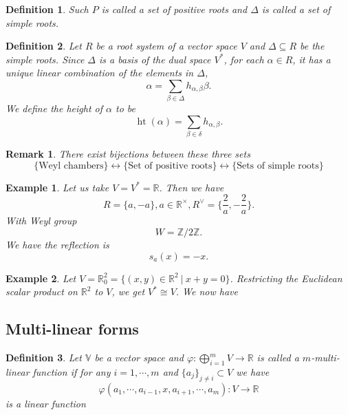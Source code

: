 \documentclass{article}
\newtheorem{definition}{Definition}[section]
\newtheorem{remark}{Remark}[section]
\newtheorem{example}{Example}[section]
\numberwithin{equation}{section}
\DeclareMathOperator{\height}{ht}
\begin{document}
\begin{definition}
Such $P$ is called a set of positive roots and $\Delta$ is called a set of simple roots.
\end{definition}

\begin{definition}
Let $R$ be a root system of a vector space $V$ and $\Delta\subseteq R$ be the simple roots. Since $\Delta$ is a basis of the dual space $V^*$, for each $\alpha\in R$, it has a unique linear combination of the elements in $\Delta$, 
\begin{equation*}
\alpha = \sum_{\beta\in\Delta} h_{\alpha,\beta}\beta.
\end{equation*}
We define the height of $\alpha$ to be
\begin{equation*}
\height(\alpha) = \sum_{\beta\in\delta} h_{\alpha,\beta}.
\end{equation*}
\end{definition}

\begin{remark}
There exist bijections between these three sets
\begin{equation*}
\{\text{Weyl chambers}\}\leftrightarrow\{\text{Set of positive roots}\}\leftrightarrow\{\text{Sets of simple roots}\}
\end{equation*}
\end{remark}

\begin{example}
Let us take $V=V^*=\mathbb{R}$. Then we have
\begin{equation*}
R = \{a,-a\},a\in\mathbb{R}^\times, R^\lor = \{{\frac 2 a}, -{\frac 2 a}\}.
\end{equation*}
With Weyl group
\begin{equation*}
W = \mathbb{Z}/2\mathbb{Z}.
\end{equation*}
We have the reflection is 
\begin{equation*}
s_a(x) = -x.
\end{equation*}
\end{example}

\begin{example}
Let $V=\mathbb{R}^2_0 = \{(x,y)\in\mathbb{R}^2\:|\: x+y=0\}$.  Restricting the Euclidean scalar product on $\mathbb{R}^2$ to $V$, we get $V^*\cong V$. We now have
\end{example}

\subsection{Multi-linear forms}
\begin{definition}
Let $\mathbb{V}$ be a vector space and $\varphi:\bigoplus_{i=1}^mV\to\mathbb{R}$ is called a $m$-multi-linear function if for any $i=1,\cdots,m$ and $\{a_j\}_{j\not=i}\subset V$ we have
\begin{equation*}
\varphi(a_1,\cdots,a_{i-1},x,a_{i+1},\cdots,a_m):V\to\mathbb{R}
\end{equation*}
is a linear function
\end{definition}
\end{document}
